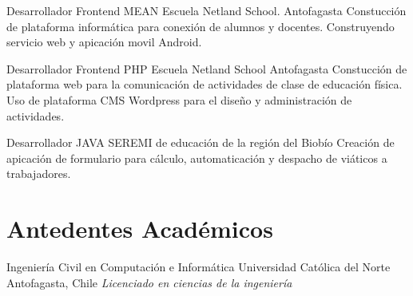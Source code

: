 \documentclass[draft,color,12pt,letterpaper,sans]{moderncv}
\begin{document}
{Desarrollador Frontend MEAN}
{Escuela Netland School.}
{Antofagasta}
{}
{Constucci\'on de plataforma inform\'atica para conexi\'on de alumnos y docentes. Construyendo servicio web y apicaci\'on movil Android.\newline}

{Desarrollador Frontend PHP}
{Escuela Netland School}
{Antofagasta}
{}
{Constucci\'on de plataforma web para la comunicaci\'on de actividades de clase de educaci\'on f\'isica. Uso de plataforma CMS Wordpress para el dise\~no y administraci\'on de actividades.\newline}

{Desarrollador JAVA}
{SEREMI de educación de la región del Biobío}
{}
{}
{Creaci\'on de apicaci\'on de formulario para c\'alculo, automaticaci\'on y despacho de vi\'aticos a trabajadores.\newline}


\section{Antedentes Acad\'emicos}
{Ingenier\'ia Civil en Computaci\'on e Inform\'atica}
{Universidad Cat\'olica del Norte}
{Antofagasta, Chile}
{\textit{Licenciado en ciencias de la ingenier\'ia}}
{}
\newpage
\end{document}
